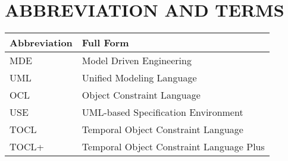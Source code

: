 \chapter*{ABBREVIATION AND TERMS}

\begin{longtable}{|>{\raggedright\arraybackslash}p{4cm}|>{\raggedright\arraybackslash}p{10cm}|}
  \hline
  \textbf{Abbreviation}       & \textbf{Full Form}           
  \\
  \hline
  MDE                    & Model Driven Engineering  
  \\
  \hline
  UML                    & Unified Modeling Language    
  \\
  \hline
  OCL                    & Object Constraint Language
  \\
  \hline
  USE                    & UML-based Specification Environment
  \\
  \hline
  TOCL                   & Temporal Object Constraint Language
  \\
  \hline
  TOCL+                  & Temporal Object Constraint Language Plus
  \\
  \hline
\end{longtable}